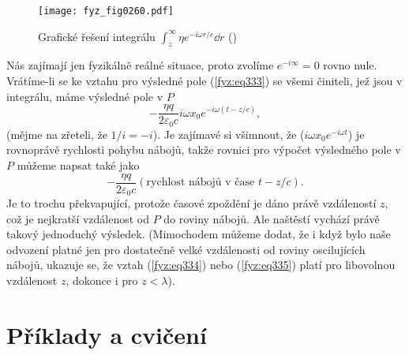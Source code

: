     \begin{figure}[ht!] %
      \centering
      \texttt{[image: fyz\_fig0260.pdf]}
      \caption{Grafické řešení integrálu \(\int_z^\infty\eta e^{-i\omega r/c}\dd{r}\)
               (\cite[s.~406]{Feynman01})}
      \label{fyz:fig0260}
    \end{figure}
    
    Nás zajímají jen fyzikálně reálné situace, proto zvolíme \(e^{-i\infty} = 0\) rovno nule. 
    Vrátíme-li se ke vztahu pro výsledné pole (\ref{fyz:eq333}) se všemi činiteli, jež jsou v 
    integrálu, máme výsledné pole v \(P\)
    \begin{equation}\label{fyz:eq334}
      -\frac{\eta q}{2\varepsilon_0c}i\omega x_0e^{-i\omega(t - z/c)},
    \end{equation}
    (mějme na zřeteli, že \(1/i = -i\)). Je zajímavé si všimnout, že (\(i\omega x_0e^{-i\omega 
    t}\)) je rovnoprávě rychlosti pohybu nábojů, takže rovnici pro výpočet výsledného pole v \(P\) 
    můžeme napsat také jako
    \begin{equation}\label{fyz:eq335}
      -\frac{\eta q}{2\varepsilon_0c}(\text{rychlost nábojů v čase }t - z/c).
    \end{equation}
    Je to trochu překvapující, protože časové zpoždění je dáno právě vzdáleností \(z\), což je 
    nejkratší vzdálenost od \(P\) do roviny nábojů. Ale naštěstí vychází právě takový jednoduchý 
    výsledek. (Mimochodem můžeme dodat, že i když bylo naše odvození platné jen pro dostatečně 
    velké vzdálenosti od roviny oscilujících nábojů, ukazuje se, že vztah (\ref{fyz:eq334}) nebo 
    (\ref{fyz:eq335}) platí pro libovolnou vzdálenost \(z\), dokonce i pro \(z<\lambda\)).
    
  \section{Příklady a cvičení}\label{fyz:IchapXXXsecVIII}


